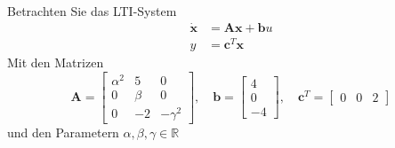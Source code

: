 \documentclass[crop=false]{standalone}
\begin{document}
\begin{task}
Betrachten Sie das LTI-System
\[
\begin{aligned} \dot{\mathbf{x}} &=\mathbf{A} \mathbf{x}+\mathbf{b} u \\ y &=\mathbf{c}^{T} \mathbf{x} \end{aligned}
\]
Mit den Matrizen
\[
\mathbf{A}=\left[\begin{array}{ccc}{\alpha^{2}} & {5} & {0} \\ {0} & {\beta} & {0} \\ {0} & {-2} & {-\gamma^{2}}\end{array}\right], \quad \mathbf{b}=\left[\begin{array}{c}{4} \\ {0} \\ {-4}\end{array}\right], \quad \mathbf{c}^{T}=\left[\begin{array}{ccc}{0} & {0} & {2}\end{array}\right]
\]
und den Parametern $\alpha, \beta, \gamma \in \mathbb{R}$


\end{task}
\end{document}
